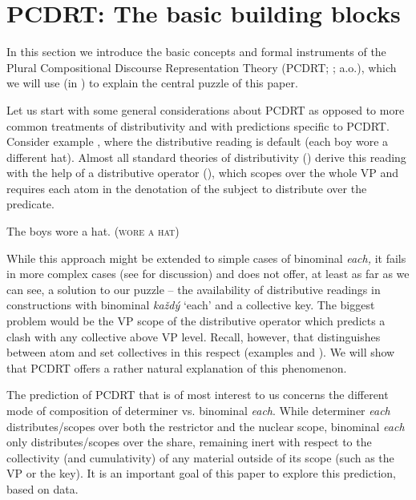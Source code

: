 \documentclass[output=paper,colorlinks,citecolor=brown,newtxmath]{langscibook}
\begin{document}
\section{PCDRT: The basic building blocks}\label{pcdrt}

In this section we introduce the basic concepts and formal instruments of the Plural Compositional Discourse Representation Theory (PCDRT; \citealt{Brasoveanu2008,Dotlacil2013}; a.o.), which we will use (in ) to explain the central puzzle of this paper.

Let us start with some general considerations about PCDRT as opposed to more common treatments of distributivity and with predictions specific to PCDRT. Consider example , where the distributive reading is default (each boy wore a different hat). Almost all standard theories of distributivity (\citealt{Bennett1974,Link1983,Schwarzschild1996,Winter2002}) derive this reading with the help of a distributive operator (), which scopes over the whole VP and requires each atom in the denotation of the subject to distribute over the predicate.

\ea\ea\label{ex:line375} The boys wore a hat.
\ex \label{ex:line375-a} (\textsc{wore a hat})
\z\z

\noindent While this approach might be extended to simple cases of binominal \textit{each,} it fails in more complex cases (see \citealt{Dotlacil2012} for discussion) and does not offer, at least as far as we can see, a solution to our puzzle -- the availability of distributive readings in constructions with binominal \textit{každý} `each' and a collective key. The biggest problem would be the VP scope of the distributive operator which predicts a clash with any collective above VP level. Recall, however, that  distinguishes between atom and set collectives in this respect (examples  and ).  We will show that PCDRT offers a rather natural explanation of this phenomenon.

The prediction of PCDRT that is of most interest to us concerns the different mode of composition of determiner vs. binominal \textit{each}. While determiner \textit{each} distributes/scopes over both the restrictor and the nuclear scope, binominal \textit{each} only distributes/scopes over the share, remaining inert with respect to the collectivity (and cumulativity) of any material outside of its scope (such as the VP or the key). It is an important goal of this paper to explore this prediction, based on  data.
\end{document}
